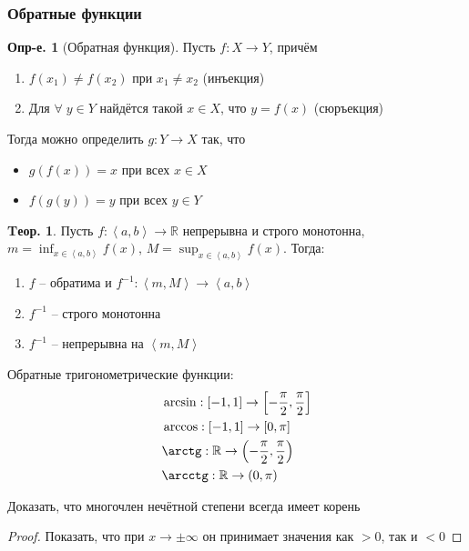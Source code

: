 \documentclass[a4paper,12pt]{article}
\numberwithin{figure}{section}
\theoremstyle{definition}
\newtheorem{definition}{Опр-е.}[section]
\theoremstyle{definition}
\newtheorem{theorem}{Tеор.}[section]
\def\DS{\displaystyle}
\def\mathR{\mathbb{R}}
\def\on{\!:}
\def\intab{\left<a,b\right>}
\def\any {$\forall\;$}
\begin{document}
\subsubsection{Обратные функции}

\begin{definition}[Обратная функция]
	Пусть $f\on X\to Y$, причём\begin{enumerate}
		\item $f(x_1)\ne f(x_2)$ при $x_1\ne x_2$ (инъекция)
		\item Для \any $y\in Y$ найдётся такой $x\in X$, что $y=f(x)$ (сюръекция)
	\end{enumerate}
	Тогда можно определить $g\on Y\to X$ так, что\begin{itemize}
		\item $g(f(x))=x$ при всех $x\in X$
		\item $f(g(y))=y$ при всех $y\in Y$
	\end{itemize}
\end{definition}

\begin{theorem}
	Пусть $f\on \intab\to\mathR$ непрерывна и строго монотонна,
	$\DS m=\inf_{x \in \intab}f(x)$,
	$\DS M=\sup_{x \in \intab}f(x)$.
	Тогда:
	\begin{enumerate}
		\item $f$ -- обратима и $f^{-1}\on \left<m,M\right> \to \intab$
		\item $f^{-1}$ -- строго монотонна
		\item $f^{-1}$ -- непрерывна на $\left<m,M\right>$
	\end{enumerate}
\end{theorem}

Обратные тригонометрические функции:
\begin{align*}
	  & \arcsin: \left[ -1, 1 \right] \to \left[ -\frac\pi2, \frac\pi2 \right]
	\\& \arccos: \left[ -1, 1 \right] \to \left[ 0, \pi \right]
	\\& \arctg:  \mathR \to \left( -\frac\pi2, \frac\pi2 \right)
	\\& \arcctg: \mathR \to \left( 0, \pi \right)
\end{align*}

\bigskip
\begin{problem}Доказать, что многочлен нечётной степени всегда имеет корень\end{problem}
\begin{proof}Показать, что при $x\to\pm\infty$ он принимает значения как $>0$, так и $<0$\end{proof}
\end{document}
